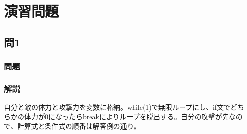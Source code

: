\section{演習問題}
\subsection{問1}
\subsubsection{問題}

\subsubsection{解説}
自分と敵の体力と攻撃力を変数に格納。while(1)で無限ループにし、if文でどちらかの体力が0になったらbreakによりループを脱出する。自分の攻撃が先なので、計算式と条件式の順番は解答例の通り。
